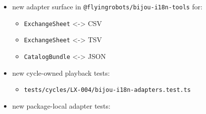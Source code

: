 \begin{itemize}
\tightlist
\item
  new adapter surface in \texttt{@\allowbreak{}f\allowbreak{}l\allowbreak{}y\allowbreak{}i\allowbreak{}n\allowbreak{}g\allowbreak{}r\allowbreak{}o\allowbreak{}b\allowbreak{}o\allowbreak{}t\allowbreak{}s\allowbreak{}/\allowbreak{}b\allowbreak{}i\allowbreak{}j\allowbreak{}o\allowbreak{}u\allowbreak{}-\allowbreak{}i\allowbreak{}1\allowbreak{}8\allowbreak{}n\allowbreak{}-\allowbreak{}t\allowbreak{}o\allowbreak{}o\allowbreak{}l\allowbreak{}s} for:

  \begin{itemize}
  \tightlist
  \item
    \texttt{E\allowbreak{}x\allowbreak{}c\allowbreak{}h\allowbreak{}a\allowbreak{}n\allowbreak{}g\allowbreak{}e\allowbreak{}S\allowbreak{}h\allowbreak{}e\allowbreak{}e\allowbreak{}t} \textless-\textgreater{} CSV
  \item
    \texttt{E\allowbreak{}x\allowbreak{}c\allowbreak{}h\allowbreak{}a\allowbreak{}n\allowbreak{}g\allowbreak{}e\allowbreak{}S\allowbreak{}h\allowbreak{}e\allowbreak{}e\allowbreak{}t} \textless-\textgreater{} TSV
  \item
    \texttt{C\allowbreak{}a\allowbreak{}t\allowbreak{}a\allowbreak{}l\allowbreak{}o\allowbreak{}g\allowbreak{}B\allowbreak{}u\allowbreak{}n\allowbreak{}d\allowbreak{}l\allowbreak{}e} \textless-\textgreater{} JSON
  \end{itemize}
\item
  new cycle-owned playback tests:

  \begin{itemize}
  \tightlist
  \item
    \texttt{t\allowbreak{}e\allowbreak{}s\allowbreak{}t\allowbreak{}s\allowbreak{}/\allowbreak{}c\allowbreak{}y\allowbreak{}c\allowbreak{}l\allowbreak{}e\allowbreak{}s\allowbreak{}/\allowbreak{}L\allowbreak{}X\allowbreak{}-\allowbreak{}0\allowbreak{}0\allowbreak{}4\allowbreak{}/\allowbreak{}b\allowbreak{}i\allowbreak{}j\allowbreak{}o\allowbreak{}u\allowbreak{}-\allowbreak{}i\allowbreak{}1\allowbreak{}8\allowbreak{}n\allowbreak{}-\allowbreak{}a\allowbreak{}d\allowbreak{}a\allowbreak{}p\allowbreak{}t\allowbreak{}e\allowbreak{}r\allowbreak{}s\allowbreak{}.\allowbreak{}t\allowbreak{}e\allowbreak{}s\allowbreak{}t\allowbreak{}.\allowbreak{}t\allowbreak{}s}
  \end{itemize}
\item
  new package-local adapter tests:


\end{itemize}
